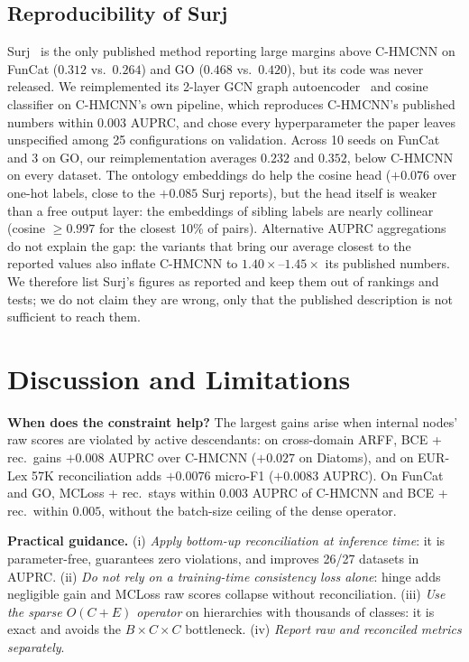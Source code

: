 \documentclass[conference]{IEEEtran}
\begin{document}
\subsection{Reproducibility of Surj}
\label{sec:repro}

Surj~\cite{www2022ontology} is the only published method reporting large margins
above C-HMCNN on FunCat ($0.312$ vs.\ $0.264$) and GO ($0.468$ vs.\ $0.420$),
but its code was never released. We reimplemented its 2-layer GCN graph
autoencoder~\cite{kipf2016vgae} and cosine classifier on C-HMCNN's own
pipeline, which reproduces C-HMCNN's published numbers within $0.003$ AUPRC,
and chose every hyperparameter the paper leaves unspecified among 25
configurations on validation. Across 10 seeds on FunCat and 3 on GO, our
reimplementation averages $0.232$ and $0.352$, below C-HMCNN on every dataset.
The ontology embeddings do help the cosine head ($+0.076$ over one-hot labels,
close to the $+0.085$ Surj reports), but the head itself is weaker than a
free output layer: the embeddings of sibling labels are nearly collinear
(cosine $\ge 0.997$ for the closest 10\% of pairs). Alternative AUPRC
aggregations do not explain the gap: the variants that bring our average
closest to the reported values also inflate C-HMCNN to
$1.40\times$--$1.45\times$ its published numbers. We therefore list Surj's figures as reported and
keep them out of rankings and tests; we do not claim they are wrong, only
that the published description is not sufficient to reach them.

\section{Discussion and Limitations}
\label{sec:discussion}

\textbf{When does the constraint help?} The largest gains arise when internal
nodes' raw scores are violated by active descendants: on cross-domain ARFF,
BCE + rec.\ gains $+0.008$ AUPRC over C-HMCNN ($+0.027$ on Diatoms), and on
EUR-Lex 57K reconciliation adds $+0.0076$ micro-F1 ($+0.0083$ AUPRC). On FunCat
and GO, MCLoss + rec.\ stays within $0.003$ AUPRC of C-HMCNN and BCE + rec.\
within $0.005$, without the batch-size ceiling of the dense operator.

\textbf{Practical guidance.} (i) \emph{Apply bottom-up reconciliation at
inference time}: it is parameter-free, guarantees zero violations, and improves
26/27 datasets in AUPRC. (ii) \emph{Do not rely on a training-time consistency
loss alone}: hinge adds negligible gain and MCLoss raw scores collapse without
reconciliation. (iii) \emph{Use the sparse $O(C{+}E)$ operator} on hierarchies with
thousands of classes: it is exact and avoids the $B\times C\times C$
bottleneck. (iv) \emph{Report raw and reconciled metrics separately}.
\end{document}
